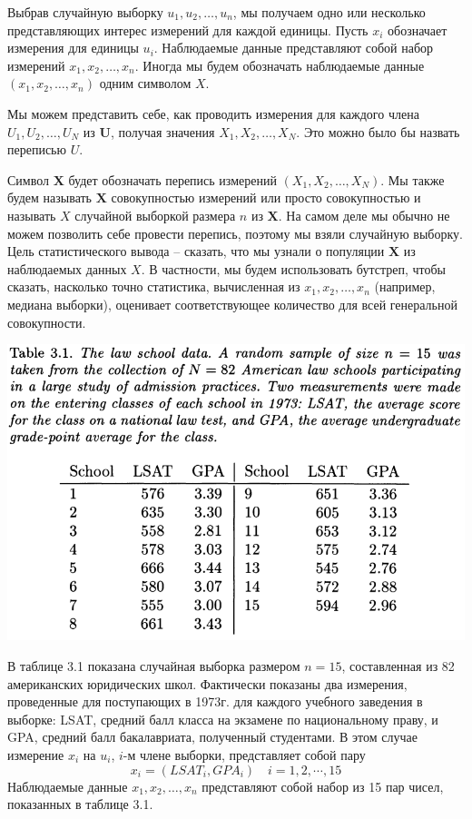 Выбрав случайную выборку $u_1, u_2,\ldots, u_n$, мы получаем одно или несколько представляющих интерес измерений для каждой единицы. Пусть $x_i$ обозначает измерения для единицы $u_i$. Наблюдаемые данные представляют собой набор измерений $x_1, x_2,\ldots, x_n$. Иногда мы будем обозначать наблюдаемые данные $(x_1, x_2, \ldots, x_n)$ одним символом $X$. 

Мы можем представить себе, как проводить измерения для каждого члена $U_1, U_2, \ldots ,U_N$ из $\mathbf{U}$, получая значения $X_1, X_2, \ldots, X_N$. Это можно было бы назвать переписью $U$. 

Символ $\mathbf{X}$ будет обозначать перепись измерений $(X_1, X_2,\ldots, X_N)$. Мы также будем называть $\mathbf{X}$ совокупностью измерений или просто совокупностью и называть $X$ случайной выборкой размера $n$ из $\mathbf{X}$. На самом деле мы обычно не можем позволить себе провести перепись, поэтому мы взяли случайную выборку. Цель статистического вывода -- сказать, что мы узнали о популяции $\mathbf{X}$ из наблюдаемых данных $X$. В частности, мы будем использовать бутстреп, чтобы сказать, насколько точно статистика, вычисленная из $x_1, x_2,\ldots, x_n$ (например, медиана выборки), оценивает соответствующее количество для всей генеральной совокупности. 
\newline

\noindent
\includegraphics[width=\linewidth]{2/t21.png}
\newline

В таблице 3.1 показана случайная выборка размером $n = 15$, составленная из 82 американских юридических школ. Фактически показаны два измерения, проведенные для поступающих в 1973г. для каждого учебного заведения в выборке: LSAT, средний балл класса на экзамене по национальному праву, и GPA, средний балл бакалавриата, полученный студентами. В этом случае измерение $x_i$ на $u_i$, $i$-м члене выборки, представляет собой пару 
\begin{equation*}
    x_i=(LSAT_i, GPA_i)\quad i=1,2,\cdots,15
\end{equation*}
Наблюдаемые данные $x_1, x_2,\ldots, x_n$ представляют собой набор из 15 пар чисел, показанных в таблице 3.1. 

